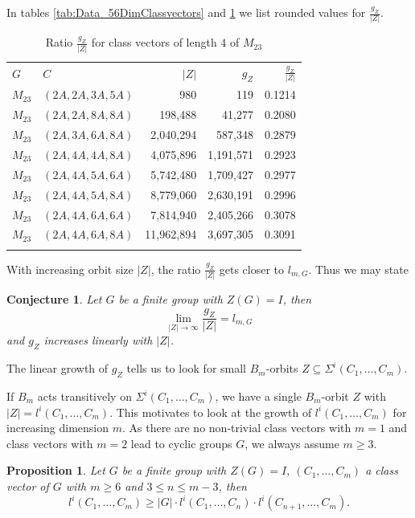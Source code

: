 \documentclass[12pt,a4paper]{article}
\newtheorem{proposition}{Proposition}[section]
\newtheorem{conjecture}{Conjecture}[section]
\numberwithin{equation}{section}
\numberwithin{table}{section}
\begin{document}
%
In tables \ref{tab:Data_56DimClassvectors} and \ref{tab:Data_Ratio4DimClassvectors} we list
rounded values for $\frac{g_Z}{\vert Z \vert}$.
%
\begin{table}[!htbp]
\centering
\footnotesize
\captionsetup{font=footnotesize}
\caption{Ratio $\frac{g_Z}{\vert Z \vert}$ for class vectors of length $4$ of $M_{23}$}
\label{tab:Data_Ratio4DimClassvectors}
\begin{tabular}{llrrr}
\hline\noalign{\smallskip}
$G$ & $C$ & $\vert Z \vert$ & $g_Z$ & $\frac{g_Z}{\vert Z \vert}$ \\
\noalign{\smallskip}\hline\noalign{\smallskip}
$M_{23}$ & $(2A,2A,3A,5A)$ & 980 & 119 & 0.1214\\
$M_{23}$ & $(2A,2A,8A,8A)$ & 198,488 & 41,277 & 0.2080\\
$M_{23}$ & $(2A,3A,6A,8A)$ & 2,040,294 & 587,348 & 0.2879\\
$M_{23}$ & $(2A,4A,4A,8A)$ & 4,075,896 & 1,191,571 & 0.2923\\
$M_{23}$ & $(2A,4A,5A,6A)$ & 5,742,480 & 1,709,427 & 0.2977\\
$M_{23}$ & $(2A,4A,5A,8A)$ & 8,779,060 & 2,630,191 & 0.2996\\
$M_{23}$ & $(2A,4A,6A,6A)$ & 7,814,940 & 2,405,266 & 0.3078\\
$M_{23}$ & $(2A,4A,6A,8A)$ & 11,962,894 & 3,697,305 & 0.3091\\
\noalign{\smallskip}\hline
\end{tabular}
\end{table}
%
With increasing orbit size $\vert Z \vert$, the ratio $\frac{g_Z}{\vert Z \vert}$ gets closer to $l_{m, G}$.
Thus we may state
%
\begin{conjecture}
\label{LimitGenus} 
Let $G$ be a finite group with $Z(G)=I$, then
$$\lim\limits_{\vert Z \vert \to\infty} \frac{g_Z}{\vert Z \vert} = l_{m, G}$$
and $g_Z$ increases linearly with $ \vert Z \vert $.
\end{conjecture}
%
\noindent
The linear growth of $g_Z$ tells us to look for small $B_m$-orbits $Z \subseteq \Sigma^i(C_1,\dots, C_m)$.
\par
\noindent
If $B_m$ acts transitively on $\Sigma^i(C_1,\dots, C_m)$, we have a single $B_m$-orbit $Z$
with $\vert Z \vert = l^i(C_1,\dots, C_m)$.
This motivates to look at the growth of $l^i(C_1,\dots, C_m)$ for increasing dimension $m$.
As there are no non-trivial class vectors with $m=1$ and class vectors with $m=2$ lead to cyclic groups $G$,
we always assume $m \geq 3$.
%
\begin{proposition}
\label{LowerBoundLiC} 
Let $G$ be a finite group with $Z(G) = I$, $(C_1,\dots, C_m)$ a class vector of $G$
with $m \geq 6$ and $3 \leq n \leq m-3$, then
$$l^i(C_1,\dots, C_m) \geq \vert G \vert \cdot l^i(C_1,\dots, C_n) \cdot l^i(C_{n+1},\dots, C_m).$$
\end{proposition}
\end{document}
